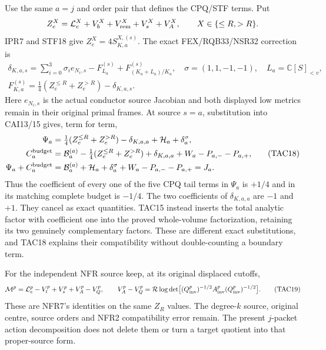 \documentclass[11pt,a4paper]{article}
\begin{document}
Use the same $a=j$ and order pair that defines the CPQ/STF terms.  Put
\[
 Z_e^X=\mathcal L_e^X+V_b^X+V_{\rm rem}^X+V_s^X+V_A^X,
 \qquad X\in\{\le R,>R\}.
\]
IPR7 and STF18 give $Z_e^X=4S_{K,a}^{X,(s)}$.  The exact
FEX/RQB33/NSR32 correction is
\[
 \begin{gathered}
 \delta_{K,a,s}=\sum_{i=0}^3\sigma_i e_{N_i,s}
                  -F_{L_a}^{(s)}+F_{(K_a+L_a)/K_a}^{(s)},
 \quad \sigma=(1,1,-1,-1),\quad L_a=\mathbb C[S]_{<v},\\
 F_{K,a}^{(s)}=\tfrac14(Z_e^{\le R}+Z_e^{>R})-\delta_{K,a,s}.
 \end{gathered}
 \tag{TAC17}
\]
Here $e_{N_i,s}$ is the actual conductor source Jacobian and both
displayed low metrics remain in their original primal frames.
At source $s=a$, substitution into CAI13/15 gives, term for term,
\[
 \begin{split}
 \Psi_a&=\tfrac14(Z_e^{\le R}+Z_e^{>R})-\delta_{K,a,a}
                  +\mathcal H_a+\delta_a^\sigma,\\
 C_a^{\rm budget}&=\mathcal B_a^{(a)}
       -\tfrac14(Z_e^{\le R}+Z_e^{>R})+\delta_{K,a,a}
                       +W_a-P_{a,-}-P_{a,+},\\
 \Psi_a+C_a^{\rm budget}
     &=\mathcal B_a^{(a)}+\mathcal H_a+\delta_a^\sigma
                       +W_a-P_{a,-}-P_{a,+}=J_a.
 \end{split}
 \tag{TAC18}
\]
Thus the coefficient of every one of the five CPQ tail terms in
$\Psi_a$ is $+1/4$ and in its matching complete budget is $-1/4$.
The two coefficients of $\delta_{K,a,a}$ are $-1$ and $+1$.
They cancel as exact quantities.  TAC15 instead inserts the total
analytic factor with coefficient one into the proved whole-volume
factorization, retaining its two genuinely complementary factors.
These are different exact substitutions, and TAC18 explains their
compatibility without double-counting a boundary term.

For the independent NFR source keep, at its original displaced cutoffs,
\[
 \mathcal M^p=\mathcal L_e^p-V_t^p+V_s^p+V_A^p-V_Q^p,
 \qquad V_A^p-V_Q^p
   =\mathcal R\log\det\bigl[(Q_{\rm inv}^p)^{-1/2}
                A_{\rm inv}^p(Q_{\rm inv}^p)^{-1/2}\bigr].
 \tag{TAC19}
\]
These are NFR7's identities on the same $Z_R$ values.  The degree-$k$
source, original centre, source orders and NFR2 compatibility error
remain.  The present $j$-packet action decomposition does not delete
them or turn a target quotient into that proper-source form.
\end{document}
